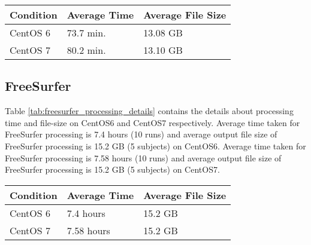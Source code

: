
\begin{center}
\tabulinesep=1.2mm
\begin{tabular}{ | l | l | l | }
  \hline
    \textbf{Condition} & \textbf{Average Time} & \textbf{Average File Size} \\
  \hline
    CentOS 6 & 73.7 min. & 13.08 GB \\
  \hline
    CentOS 7 & 80.2 min. & 13.10 GB \\
  \hline
\end{tabular}
\label{tab:prefreesurfer_processing_details}
\end{center}



\subsection{FreeSurfer}
Table \ref{tab:freesurfer_processing_details} contains the details about processing time and file-size on CentOS6 and CentOS7 respectively.
Average time taken for FreeSurfer processing is 7.4 hours (10 runs) and average output file size of FreeSurfer processing is 15.2 GB (5 subjects) on CentOS6.
Average time taken for FreeSurfer processing is 7.58 hours (10 runs) and average output file size of FreeSurfer processing is 15.2 GB (5 subjects) on CentOS7.

\begin{center}
\begin{tabular}{ | l | l | l | }
  \hline
    \textbf{Condition} & \textbf{Average Time} & \textbf{Average File Size} \\
  \hline
    CentOS 6 & 7.4 hours & 15.2 GB \\
  \hline
    CentOS 7 & 7.58 hours & 15.2 GB \\
  \hline
\end{tabular}
\label{tab:freesurfer_processing_details}
\end{center}


